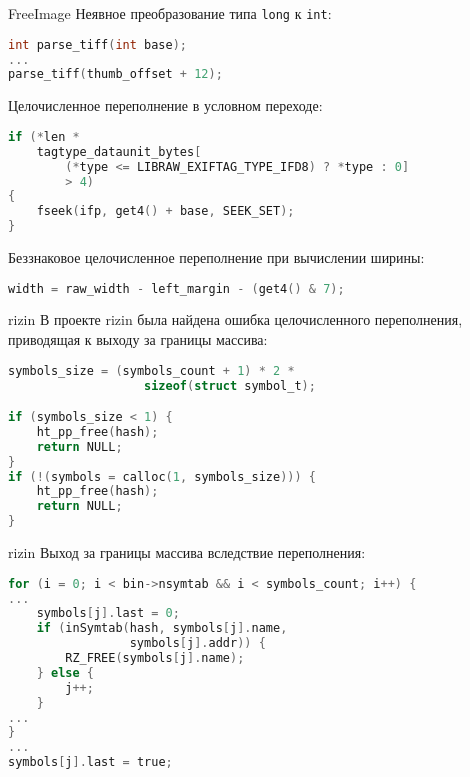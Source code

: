 \documentclass[10pt]{beamer}
\begin{document}
\begin{frame}[fragile]{FreeImage}
Неявное преобразование типа \texttt{long} к \texttt{int}:
\begin{lstlisting}[language=C, basicstyle=\small\ttfamily,
                   xleftmargin=1em,
                   captionpos=b,
                   label=lst:freeimage-tiff-implicit]
int parse_tiff(int base);
...
parse_tiff(thumb_offset + 12);
\end{lstlisting}

Целочисленное переполнение в условном переходе:
\begin{lstlisting}[language=C, basicstyle=\small\ttfamily,
                   xleftmargin=1em,
                   captionpos=b,
                   label=lst:freeimage-condition-overflow]
if (*len *
    tagtype_dataunit_bytes[
        (*type <= LIBRAW_EXIFTAG_TYPE_IFD8) ? *type : 0]
        > 4)
{
    fseek(ifp, get4() + base, SEEK_SET);
}
\end{lstlisting}

Беззнаковое целочисленное переполнение при вычислении ширины:
\begin{lstlisting}[language=C, basicstyle=\small\ttfamily,
                   xleftmargin=1em,
                   captionpos=b,
                   label=lst:freeimage-width-overflow]
width = raw_width - left_margin - (get4() & 7);
\end{lstlisting}
\end{frame}

\begin{frame}[fragile]{rizin}
В проекте rizin была найдена ошибка целочисленного переполнения, приводящая к
выходу за границы массива:
\begin{lstlisting}[language=C, basicstyle=\small\ttfamily,
                   xleftmargin=1em,
                   captionpos=b,
                   label=lst:rizin-overflow]
symbols_size = (symbols_count + 1) * 2 *
                   sizeof(struct symbol_t);

if (symbols_size < 1) {
    ht_pp_free(hash);
    return NULL;
}
if (!(symbols = calloc(1, symbols_size))) {
    ht_pp_free(hash);
    return NULL;
}
\end{lstlisting}
\end{frame}

\begin{frame}[fragile]{rizin}
Выход за границы массива вследствие переполнения:
\begin{lstlisting}[language=C, basicstyle=\small\ttfamily,
                   xleftmargin=1em,
                   captionpos=b,
                   label=lst:rizin-oob]
for (i = 0; i < bin->nsymtab && i < symbols_count; i++) {
...
    symbols[j].last = 0;
    if (inSymtab(hash, symbols[j].name,
                 symbols[j].addr)) {
        RZ_FREE(symbols[j].name);
    } else {
        j++;
    }
...
}
...
symbols[j].last = true;
\end{lstlisting}
\end{frame}
\end{document}
